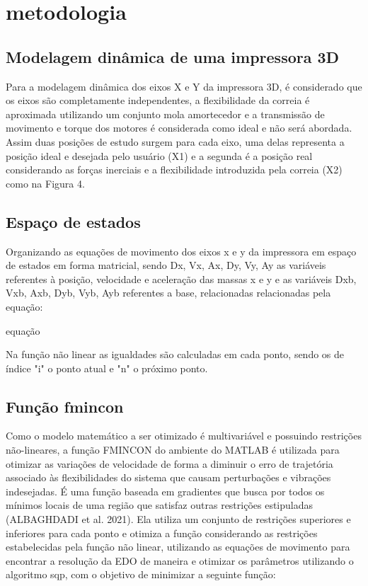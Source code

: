 \chapter{metodologia}

\section{Modelagem dinâmica de uma impressora 3D}
Para a modelagem dinâmica dos eixos X e Y da impressora 3D, 
é considerado que os eixos são completamente independentes, 
a flexibilidade da correia é aproximada utilizando um conjunto 
mola amortecedor e a transmissão de movimento e torque dos 
motores é considerada como ideal e não será abordada.
Assim duas posições de estudo surgem para cada eixo, uma delas 
representa a posição ideal e desejada pelo usuário (X1) e a 
segunda é a posição real considerando as forças inerciais e a 
flexibilidade introduzida pela correia (X2) como na Figura 4.

\section{Espaço de estados}
Organizando as equações de movimento dos eixos x e y da 
impressora em espaço de estados em forma matricial, sendo 
Dx, Vx, Ax, Dy, Vy, Ay as variáveis referentes à posição,
velocidade e aceleração das massas x e y e as variáveis Dxb, 
Vxb, Axb, Dyb, Vyb, Ayb referentes a base, relacionadas 
relacionadas pela equação:

equação

Na função não linear as igualdades são calculadas em cada ponto, 
sendo os de índice "i" o ponto atual e "n" o próximo ponto.

\section{Função fmincon}
Como o modelo matemático a ser otimizado é multivariável e 
possuindo restrições não-lineares, a função FMINCON do ambiente 
do MATLAB é utilizada para otimizar as variações de velocidade 
de forma a diminuir o erro de trajetória associado às 
flexibilidades do sistema que causam perturbações e vibrações 
indesejadas.
É uma função baseada em gradientes que busca por todos os 
mínimos locais de uma região que satisfaz outras restrições 
estipuladas (ALBAGHDADI et al. 2021).
Ela utiliza um conjunto de restrições superiores e inferiores 
para cada ponto e otimiza a função considerando as restrições 
estabelecidas pela função não linear, utilizando as equações de 
movimento para encontrar a resolução da EDO de maneira e 
otimizar os parâmetros utilizando o algoritmo sqp, com o 
objetivo de minimizar a seguinte função:

